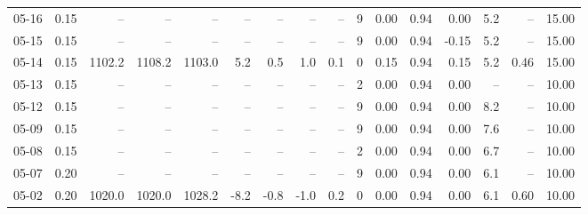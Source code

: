 \begin{threeparttable}
{\begin{tabular}{lrrrrrrrrrrrrrrr}
  05-16 &     0.15 &     -- &     -- &     -- &         -- &             -- &                       -- &                  -- &              9 &       0.00 &      0.94 &           0.00 &              5.2 &              -- &                  15.00 \\
  05-15 &     0.15 &     -- &     -- &     -- &         -- &             -- &                       -- &                  -- &              9 &       0.00 &      0.94 &          -0.15 &              5.2 &              -- &                  15.00 \\
  05-14 &     0.15 & 1102.2 & 1108.2 & 1103.0 &        5.2 &            0.5 &                      1.0 &                 0.1 &              0 &       0.15 &      0.94 &           0.15 &              5.2 &            0.46 &                  15.00 \\
  05-13 &     0.15 &     -- &     -- &     -- &         -- &             -- &                       -- &                  -- &              2 &       0.00 &      0.94 &           0.00 &               -- &              -- &                  10.00 \\
  05-12 &     0.15 &     -- &     -- &     -- &         -- &             -- &                       -- &                  -- &              9 &       0.00 &      0.94 &           0.00 &              8.2 &              -- &                  10.00 \\
  05-09 &     0.15 &     -- &     -- &     -- &         -- &             -- &                       -- &                  -- &              9 &       0.00 &      0.94 &           0.00 &              7.6 &              -- &                  10.00 \\
  05-08 &     0.15 &     -- &     -- &     -- &         -- &             -- &                       -- &                  -- &              2 &       0.00 &      0.94 &           0.00 &              6.7 &              -- &                  10.00 \\
  05-07 &     0.20 &     -- &     -- &     -- &         -- &             -- &                       -- &                  -- &              9 &       0.00 &      0.94 &           0.00 &              6.1 &              -- &                  10.00 \\
  05-02 &     0.20 & 1020.0 & 1020.0 & 1028.2 &       -8.2 &           -0.8 &                     -1.0 &                 0.2 &              0 &       0.00 &      0.94 &           0.00 &              6.1 &            0.60 &                  10.00 \\

\end{tabular}}
\end{threeparttable}

